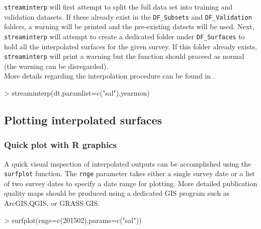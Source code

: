 \documentclass[12pt]{article}
\begin{document}
\texttt{streaminterp} will first attempt to split the full data set into training and validation datasets. If these already exist in the \verb|DF_Subsets| and \verb|DF_Validation| folders, a warning will be printed and the pre-existing datsets will be used. Next, \texttt{streaminterp} will attempt to create a dedicated folder under \verb|DF_Surfaces| to hold all the interpolated surfaces for the given survey. If this folder already exists, \texttt{streaminterp} will print a warning but the function should proceed as normal (the warning can be disregarded).\\

More details regarding the interpolation procedure can be found in \cite{stachelek2015application}.

\begin{Schunk}
\begin{Sinput}
> streaminterp(dt,paramlist=c("sal"),yearmon)
\end{Sinput}
\end{Schunk}

\subsection{\label{sec:plottingsurf}Plotting interpolated surfaces}

\subsubsection{Quick plot with R graphics}

A quick visual inspection of interpolated outputs can be accomplished using the \nohyphens{\texttt{surfplot}} function. The \texttt{rnge} parameter takes either a single survey date or a list of two survey dates to specify a date range for plotting. More detailed publication quality maps should be produced using a dedicated GIS program such as ArcGIS,QGIS, or GRASS GIS.

\begin{Schunk}
\begin{Sinput}
> surfplot(rnge=c(201502),params=c("sal"))
\end{Sinput}
\end{Schunk}


\end{document}
